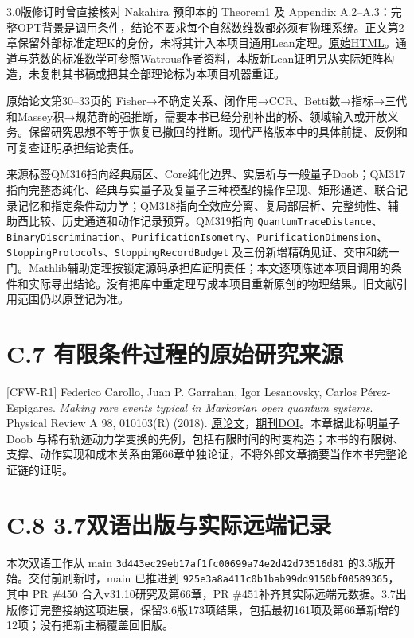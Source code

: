 \documentclass[
  11pt,
  oneside]{book}
\begin{document}
3.0版修订时曾直接核对 Nakahira 预印本的 Theorem1 及 Appendix
A.2--A.3：完整OPT背景是调用条件，结论不要求每个自然数维数都必须有物理系统。正文第2章保留外部标准定理K的身份，未将其计入本项目通用Lean定理。\href{https://arxiv.org/html/2605.23217v1}{原始HTML}。通道与范数的标准数学可参照\href{https://cs.uwaterloo.ca/~watrous/TQI/}{Watrous作者资料}，本版新Lean证明另从实际矩阵构造，未复制其书稿或把其全部理论标为本项目机器重证。

原始论文第30--33页的
Fisher→不确定关系、闭作用→CCR、Betti数→指标→三代和Massey积→规范群的强推断，需要本书已经分别补出的桥、领域输入或开放义务。保留研究思想不等于恢复已撤回的推断。现代严格版本中的具体前提、反例和可复查证明承担结论责任。

来源标签QM316指向经典扇区、Core纯化边界、实层析与一般量子Doob；QM317指向完整态纯化、经典与实量子及复量子三种模型的操作呈现、矩形通道、联合记录记忆和指定条件动力学；QM318指向全效应分离、复局部层析、完整纯性、辅助酉比较、历史通道和动作记录预算。QM319指向
\texttt{Quantum\allowbreak Trace\allowbreak Distance}、\allowbreak \texttt{Binary\allowbreak Discrimination}、\allowbreak \texttt{Purification\allowbreak Isometry}、\allowbreak \texttt{Purification\allowbreak Dimension}、\allowbreak \texttt{Stopping\allowbreak Protocols}、\allowbreak \texttt{Stopping\allowbreak Record\allowbreak Budget}
及三份新增精确见证、交审和统一门。Mathlib辅助定理按锁定源码承担库证明责任；本文逐项陈述本项目调用的条件和实际导出结论。没有把库中重定理写成本项目重新原创的物理结果。旧文献引用范围仍以原登记为准。

\section{C.7 有限条件过程的原始研究来源}

{[}CFW-R1{]} Federico Carollo, Juan P. Garrahan, Igor Lesanovsky, Carlos
Pérez-Espigares. \emph{Making rare events typical in Markovian open
quantum systems}. Physical Review A 98, 010103(R) (2018).
\href{https://arxiv.org/abs/1711.10951}{原论文}，\href{https://doi.org/10.1103/PhysRevA.98.010103}{期刊DOI}。本章据此标明量子
Doob
与稀有轨迹动力学变换的先例，包括有限时间的时变构造；本书的有限树、支撑、动作实现和成本关系由第66章单独论证，不将外部文章摘要当作本书完整论证链的证明。

\section{C.8 3.7双语出版与实际远端记录}

本次双语工作从 main \texttt{3d443ec29eb1\allowbreak 7af1fc00699a\allowbreak 74e2d42d7351\allowbreak 6d81}
的3.5版开始。交付前刷新时，main 已推进到
\texttt{925e3a8a411c\allowbreak 0b1bab99dd91\allowbreak 50bf00589365}，其中 PR \#450
合入v31.10研究及第66章，PR
\#451补齐其实际远端元数据。3.7出版修订完整接纳这项进展，保留3.6版173项结果，包括最初161项及第66章新增的12项；没有把新主稿覆盖回旧版。
\end{document}
